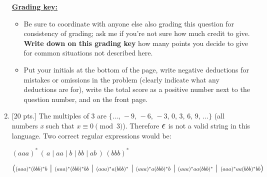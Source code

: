\documentclass[11pt,fleqn]{article}
\begin{document}
\begin{enumerate}
\begin{info}{\textbf{\underline{Grading key:}}}
\begin{itemize}
              \item Be sure to coordinate with anyone else also grading this
                    question for consistency of grading; ask me if you're
                    not sure how much credit to give.  \textbf{Write down on
                    this grading key} how many points you decide to give
                    for common situations not described here.

              \item Put your initials at the bottom of the page, write
                    negative deductions for mistakes or omissions in the
                    problem (clearly indicate what any deductions are for),
                    write the total score as a positive number next to the
                    question number, and on the front page.

            \end{itemize}

          \end{info}

          \pagebreak


    \item {[20 pts.]} The multiples of 3 are $\{ \ldots, \, -9, \, -6, \,
          -3, \, 0, \, 3, \, 6, \, 9, \, \ldots\}$ (all numbers \emph{x}
          such that $x \equiv 0\pmod 3$).  Therefore $\mbox{\Large \ensuremath{\epsilon}}$ is not
          a valid string in this language.  Two correct regular expressions
          would be:

          \enlargethispage{3mm}

          \vspace{-4.5mm}

          \begin{centering}

            \addtolength{\baselineskip}{2mm}  %

            \(
              ( aaa )^{*}
              \,
              ( \, a \mid aa \mid b  \mid bb \mid ab \, )
              \,
              ( bbb )^{*}
            \)

            \(
              \mbox{\Large \ensuremath{(}}
                ( aaa )^{*}( bbb )^{*}b
                \mbox{\Large \ensuremath{\ \mid \ }}
                ( aaa )^{*}( bbb )^{*}bb
                \mbox{\Large \ensuremath{\ \mid \ }}
                ( aaa )^{*}a( bbb )^{*}
                \mbox{\Large \ensuremath{\ \mid \ }}
                ( aaa )^{*}a( bbb )^{*}b
                \mbox{\Large \ensuremath{\ \mid \ }}
                ( aaa )^{*}aa( bbb )^{*}
                \mbox{\Large \ensuremath{\ \mid \ }}
                ( aaa )^{*}aa( bbb )^{*}bb
              \mbox{\Large \ensuremath{)}}
            \)


\end{centering}
\end{enumerate}
\end{document}
